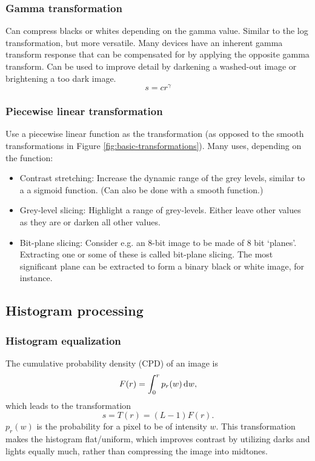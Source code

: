 \subsubsection{Gamma transformation}
Can compress blacks or whites depending on the gamma value. Similar to the log transformation, but more versatile. Many devices have an inherent gamma transform response that can be compensated for by applying the opposite gamma transform. Can be used to improve detail by darkening a washed-out image or brightening a too dark image.
\begin{equation}
    s = c r^\gamma
\end{equation}

\subsubsection{Piecewise linear transformation}
Use a piecewise linear function as the transformation (as opposed to the smooth transformations in Figure \ref{fig:basic-transformations}). Many uses, depending on the function:
\begin{itemize}
    \item Contrast stretching: Increase the dynamic range of the grey levels, similar to a a sigmoid function. (Can also be done with a smooth function.)
    \item Grey-level slicing: Highlight a range of grey-levels. Either leave other values as they are or darken all other values.
    \item Bit-plane slicing: Consider e.g. an 8-bit image to be made of 8 bit `planes'. Extracting one or some of these is called bit-plane slicing. The most significant plane can be extracted to form a binary black or white image, for instance.
\end{itemize}

\subsection{Histogram processing}

\subsubsection{Histogram equalization}
The cumulative probability density (CPD) of an image is
\begin{equation}
    F(r) = \int_0^r p_r (w) \dif w ,
\end{equation}
which leads to the transformation
\begin{equation}
    s = T(r) = (L-1) F(r).
\end{equation}
$p_r(w)$ is the probability for a pixel to be of intensity $w$. This transformation makes the histogram flat/uniform, which improves contrast by utilizing darks and lights equally much, rather than compressing the image into midtones.

